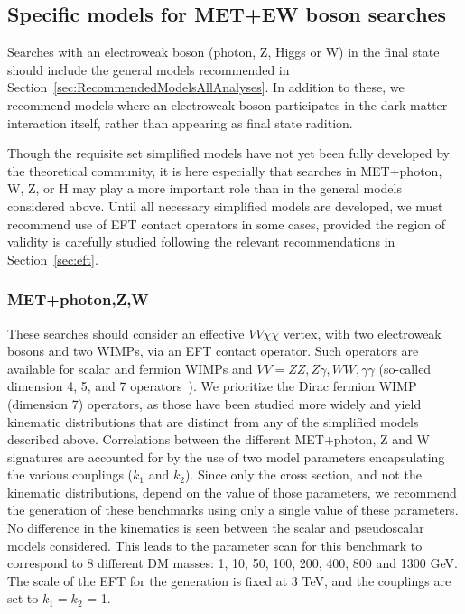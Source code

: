 \documentclass[debug,notitlepage]{dmfm}
\begin{document}
\subsection{Specific models for MET+EW boson searches}

Searches with an electroweak boson (photon, Z, Higgs or W) in the
final state should include the general models recommended in
Section~\ref{sec:RecommendedModelsAllAnalyses}. In addition to these,
we recommend models where an electroweak boson participates in
the dark matter interaction itself, rather than appearing as final
state radition.

Though the requisite set simplified models have not yet been fully
developed by the theoretical community, it is here especially that
searches in MET+photon, W, Z, or H may play a more important role than
in the general models considered above. Until all necessary simplified models
are developed, we must recommend use of EFT contact operators
in some cases, provided the region of validity is carefully studied
following the relevant recommendations in Section~\ref{sec:eft}.


\subsubsection{MET+photon,Z,W} 

These searches should consider an
effective $VV\chi\chi$ vertex, with two electroweak bosons and two WIMPs,
via an EFT contact operator. Such operators are available for scalar
and fermion WIMPs and $VV=ZZ,Z \gamma,WW,\gamma \gamma$ (so-called
dimension 4, 5, and 7 operators~\cite{Carpenter:2012rg,
Crivellin:2015wva}). We prioritize the Dirac fermion WIMP (dimension
7) operators, as those have been studied more widely and yield
kinematic distributions that are distinct from any of the simplified
models described above.  Correlations between the different
MET+photon, Z and W signatures are accounted for by the use of two
model parameters encapsulating the various couplings ($k_1$ and $k_2$). 
Since only the cross section, and not the kinematic
distributions, depend on the value of those parameters, we recommend
the generation of these benchmarks using only a single value of these
parameters. No difference in the kinematics is seen between the scalar
and pseudoscalar models considered.  This leads to the parameter scan
for this benchmark to correspond to 8 different DM masses: 
1, 10, 50, 100, 200, 400, 800 and 1300 GeV. The scale of the EFT
for the generation is fixed at 3 TeV, and the couplings are
set to $k_1 = k_2$ = 1. 
\end{document}

